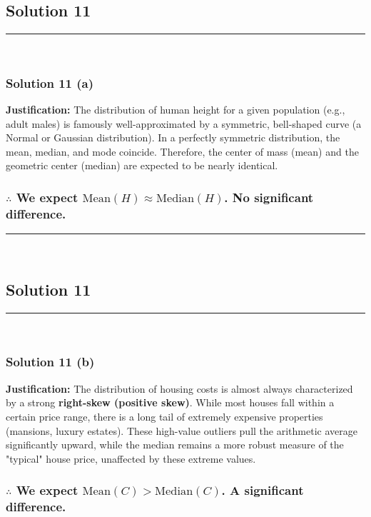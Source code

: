 \documentclass{article}
\begin{document}
\newpage

\subsection*{Solution 11}
\noindent\rule{\textwidth}{0.4pt}\\
\subsubsection*{Solution  11 (a)}

\parbox{\textwidth}{
    \textbf{Justification:} The distribution of human height for a given population (e.g., adult males) is famously well-approximated by a symmetric, bell-shaped curve (a Normal or Gaussian distribution). In a perfectly symmetric distribution, the mean, median, and mode coincide. Therefore, the center of mass (mean) and the geometric center (median) are expected to be nearly identical.
}

\subsubsection*{\normalfont $\therefore$ We expect $\text{Mean}(H) \approx \text{Median}(H)$. No significant difference.}

\noindent\rule{\textwidth}{0.4pt}\\

\newpage

\subsection*{Solution 11}
\noindent\rule{\textwidth}{0.4pt}\\
\subsubsection*{Solution  11 (b)}

\parbox{\textwidth}{
    \textbf{Justification:} The distribution of housing costs is almost always characterized by a strong \textbf{right-skew (positive skew)}. While most houses fall within a certain price range, there is a long tail of extremely expensive properties (mansions, luxury estates). These high-value outliers pull the arithmetic average significantly upward, while the median remains a more robust measure of the "typical" house price, unaffected by these extreme values.
}

\subsubsection*{\normalfont $\therefore$ We expect $\text{Mean}(C) > \text{Median}(C)$. A significant difference.}
\end{document}
